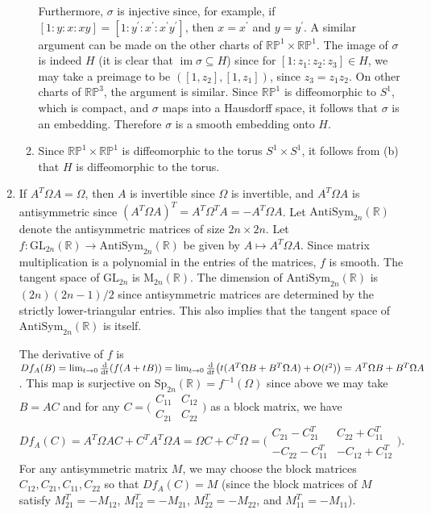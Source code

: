 \documentclass[11pt,leqno]{article}
\theoremstyle{plain}
\theoremstyle{definition}
\numberwithin{equation}{section}
\numberwithin{lem}{section}
\DeclareMathOperator{\im}{im}
\newcommand{\GL}{\mathrm{GL}}
\newcommand{\Mat}{\mathrm{M}}
\newcommand{\Sp}{\mathrm{Sp}}
\newcommand{\AS}{\mathrm{AntiSym}}
\begin{document}
\begin{enumerate}
\begin{enumerate}
      Furthermore, $\sigma$ is injective since, for example, if $[1:y:x:xy] = [1:y^\prime:x^\prime:x^\prime y^\prime]$, then $x = x^\prime$ and $y = y^\prime$. A similar argument can be made on the other charts of $\mathbb{RP}^1\times\mathbb{RP}^1$. The image of $\sigma$ is indeed $H$ (it is clear that $\im \sigma\subseteq H$) since for $[1:z_1:z_2:z_3]\in H$, we may take a preimage to be $([1,z_2],[1,z_1])$, since $z_3 = z_1z_2$. On other charts of $\mathbb{RP}^3$, the argument is similar. Since $\mathbb{RP}^1$ is diffeomorphic to $S^1$, which is compact, and $\sigma$ maps into a Hausdorff space, it follows that $\sigma$ is an embedding. Therefore $\sigma$ is a smooth embedding onto $H$.
      \item Since $\mathbb{RP}^1\times\mathbb{RP}^1$ is diffeomorphic to the torus $S^1\times S^1$, it follows from (b) that $H$ is diffeomorphic to the torus.
    \end{enumerate}
    \item If $A^T\Omega A = \Omega$, then $A$ is invertible since $\Omega$ is invertible, and $A^T\Omega A$ is antisymmetric since $(A^T\Omega A)^T = A^T\Omega^T A = -A^T\Omega A$. Let $\AS_{2n}(\mathbb R)$ denote the antisymmetric matrices of size $2n\times 2n$. Let $f\colon \GL_{2n}(\mathbb R)\to\AS_{2n}(\mathbb R)$ be given by $A\mapsto A^T\Omega A$. Since matrix multiplication is a polynomial in the entries of the matrices, $f$ is smooth. The tangent space of $\GL_{2n}$ is $\Mat_{2n}(\mathbb R)$. The dimension of $\AS_{2n}(\mathbb R)$ is $(2n)(2n-1)/2$ since antisymmetric matrices are determined by the strictly lower-triangular entries. This also implies that the tangent space of $\AS_{2n}(\mathbb R)$ is itself.
    
    The derivative of $f$ is $Df_A(B) = \lim_{t\to 0}\dv{t}(f(A+tB)) = \lim_{t\to 0}\dv{t}(t(A^T\Omega B + B^T\Omega A) + O(t^2)) = A^T\Omega B + B^T\Omega A$. This map is surjective on $\Sp_{2n}(\mathbb R) = f^{-1}(\Omega)$ since above we may take $B = AC$ and for any $C = \big(\!\begin{smallmatrix}
      C_{11} & C_{12} \\
      C_{21} & C_{22}
    \end{smallmatrix}\!\big)$ as a block matrix, we have $Df_A(C) = A^T\Omega AC + C^TA^{T}\Omega A = \Omega C +C^T\Omega = \Big(\!\begin{smallmatrix}
      C_{21} - C_{21}^T & C_{22}+C_{11}^T \\
      -C_{22}-C_{11}^T & -C_{12} + C_{12}^T
    \end{smallmatrix}\!\Big)$. For any antisymmetric matrix $M$, we may choose the block matrices $C_{12},C_{21},C_{11},C_{22}$ so that $Df_A(C) = M$ (since the block matrices of $M$ satisfy $M_{21}^T = -M_{12}$, $M_{12}^T = -M_{21}$, $M_{22}^T = -M_{22}$, and $M_{11}^T = -M_{11}$).


\end{enumerate}
\end{document}
